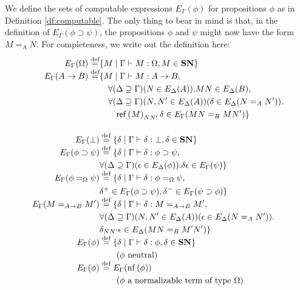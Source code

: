 We define the sets of computable expressions $E_\Gamma(\phi)$ for propositions
$\phi$ as in Definition \ref{df:computable}.  The only thing to bear in mind
is that, in the definition of $E_\Gamma(\phi \supset \psi)$, the
propositions $\phi$ and $\psi$ might now have the form $M =_A N$.  For completeness, we write out the definition here:

\begin{align*}
E_\Gamma(\Omega) \mathrel{\smash{\stackrel{\text{def}}{=}}} & \{ M \mid \Gamma \vdash M : \Omega, M \in \mathbf{SN} \} \\
E_\Gamma(A \rightarrow B) \mathrel{\smash{\stackrel{\text{def}}{=}}} & \{ M \mid \Gamma \vdash M : A \rightarrow B, \\
& \quad \forall (\Delta \supseteq \Gamma) (N \in E_\Delta(A)). MN \in E_\Delta(B), \\
& \quad \forall (\Delta \supseteq \Gamma) (N, N' \in E_\Delta(A)) (\delta \in E_\Delta(N =_A N')). \\
& \quad \quad \mathsf{ref} \left( {M} \right)_{N N'} \delta \in E_\Gamma(MN =_B MN') \} \\
\\
E_\Gamma(\bot) & \mathrel{\smash{\stackrel{\text{def}}{=}}} \{ \delta \mid \Gamma \vdash \delta : \bot, \delta \in \mathbf{SN} \} \\
E_\Gamma(\phi \supset \psi) & \mathrel{\smash{\stackrel{\text{def}}{=}}} \{ \delta \mid \Gamma \vdash \delta : \phi \supset \psi, \\
& \forall (\Delta \supseteq \Gamma)(\epsilon \in E_\Delta(\phi)). \delta \epsilon \in E_\Gamma(\psi) \} \\
E_\Gamma(\phi =_\Omega \psi) & \mathrel{\smash{\stackrel{\text{def}}{=}}} \{ \delta \mid \Gamma \vdash \delta : \phi =_\Omega \psi, \\
& \delta^+ \in E_\Gamma(\phi \supset \psi), \delta^- \in E_\Gamma(\psi \supset \phi) \} \\
E_\Gamma(M =_{A \rightarrow B} M') & \mathrel{\smash{\stackrel{\text{def}}{=}}} \{ \delta \mid \Gamma \vdash \delta : M =_{A \rightarrow B} M', \\
& \forall (\Delta \supseteq \Gamma) (N, N' \in E_\Delta(A)) (\epsilon \in E_\Delta(N =_A N')). \\
& \delta_{NN'}\epsilon \in E_\Delta(MN =_B M'N') \} \\
E_\Gamma(\phi) & \mathrel{\smash{\stackrel{\text{def}}{=}}} \{ \delta \mid \Gamma \vdash \delta : \phi, \delta \in \mathbf{SN} \} \\
& \qquad (\phi \text{ neutral}) \\
E_\Gamma(\phi) & \mathrel{\smash{\stackrel{\text{def}}{=}}} E_\Gamma(\mathrm{nf} \left( {\phi} \right)) \\
& \qquad (\phi \mbox{ a normalizable term of type $\Omega$}) \\
\end{align*}

